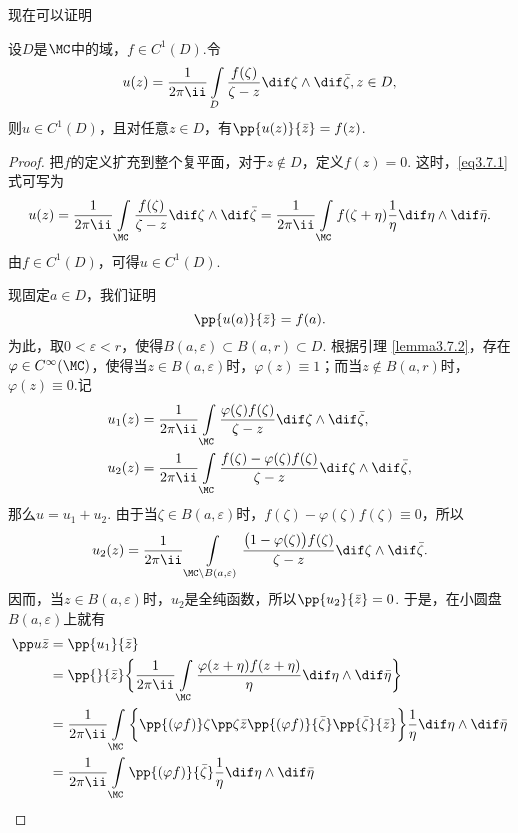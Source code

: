 现在可以证明
\begin{theorem}\label{thm3.7.3}
设$D$是$\MC$中的域，$f\in C^1(D)$.令
\begin{equation}\label{eq3.7.1}
u(z)=\frac1{2\pi\ii}\int\limits_D\frac{f(\zeta)}{\zeta-z}\dif \zeta\wedge\dif \bar \zeta,z\in D,
\end{equation}
则$u\in C^1(D)$，且对任意$z\in D$，有$\pp{u(z)}{\bar z}=f(z)$.
\end{theorem}
\begin{proof}
把$f$的定义扩充到整个复平面，对于$z\notin D$，定义$f(z)=0$. 这时，\eqref{eq3.7.1} 式可写为
\[u(z)=\frac1{2\pi\ii}\int\limits_\MC\frac{f(\zeta)}{\zeta-z}\dif \zeta\wedge\dif \bar\zeta=\frac1{2\pi\ii}\int\limits_\MC f(\zeta+\eta)\frac1\eta\dif \eta\wedge\dif \bar\eta.\]
由$f\in C^1(D)$，可得$u\in C^1(D)$.

现固定$a\in D$，我们证明
\[\pp{u(a)}{\bar z}=f(a).\]
为此，取$0<\varepsilon<r$，使得$B(a,\varepsilon)\subset B(a,r)\subset D$. 根据引理 \ref{lemma3.7.2}，存在$\varphi\in C^\infty(\MC)$，使得当$z\in B(a,\varepsilon)$时，$\varphi(z)\equiv1$；而当$z\notin B(a,r)$时，$\varphi(z)\equiv0$.记
\begin{align*}
&u_1(z)=\frac1{2\pi\ii}\int\limits_\MC\frac{\varphi(\zeta)f(\zeta)}{\zeta-z}\dif \zeta\wedge\dif \bar \zeta,\\
&u_2(z)=\frac1{2\pi\ii}\int\limits_\MC\frac{f(\zeta)-\varphi(\zeta)f(\zeta)}{\zeta-z}\dif \zeta\wedge\dif \bar \zeta,
\end{align*}
那么$u=u_1+u_2$. 由于当$\zeta\in B(a,\varepsilon)$时，$f(\zeta)-\varphi(\zeta)f(\zeta)\equiv0$，所以
\[u_2(z)=\frac1{2\pi\ii}\int\limits_{\MC\backslash B(a,\varepsilon)}\frac{\big(1-\varphi(\zeta)\big)f(\zeta)}{\zeta-z}\dif \zeta\wedge\dif \bar \zeta.\]
因而，当$z\in B(a,\varepsilon)$时，$u_2$是全纯函数，所以$\pp{u_2}{\bar z}=0$. 于是，在小圆盘$B(a,\varepsilon)$上就有
\begin{equation}\label{eq3.7.2}
\begin{aligned}
\pp u{\bar z}&=\pp{u_1}{\bar z}\\
&=\pp{}{\bar z}\bigg\{\frac1{2\pi\ii}\int\limits_\MC\frac{\varphi(z+\eta)f(z+\eta)}\eta\dif \eta\wedge\dif \bar\eta\bigg\}\\
&=\frac1{2\pi\ii}\int\limits_\MC\bigg\{\pp{(\varphi f)}\zeta\pp\zeta{\bar z}
\pp{(\varphi f)}{\bar \zeta}\pp{\bar \zeta}{\bar z}\bigg\}\frac1\eta\dif \eta\wedge\dif \bar\eta\\
&=\frac1{2\pi\ii}\int\limits_\MC\pp{(\varphi f)}{\bar\zeta}\frac1\eta\dif \eta\wedge\dif \bar\eta\\

\end{aligned}
\end{equation}
\end{proof}
